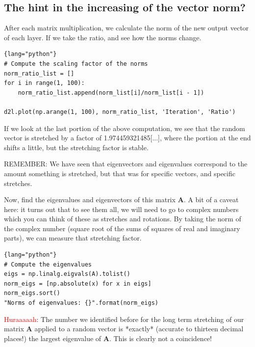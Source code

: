 \subsection{The hint in the increasing of the vector norm?}

After each matrix multiplication, we calculate the norm of the new output vector of each layer. If we take the ratio, 
and see how the norms change. 

\begin{mdframed}

\begin{lstlisting}{lang="python"}
# Compute the scaling factor of the norms
norm_ratio_list = []
for i in range(1, 100):
    norm_ratio_list.append(norm_list[i]/norm_list[i - 1])

d2l.plot(np.arange(1, 100), norm_ratio_list, 'Iteration', 'Ratio')
\end{lstlisting}

If we look at the last portion of the above computation, we see that the random
vector is stretched by a factor of 1.974459321485[...], where the portion at
the end shifts a little, but the stretching factor is stable.

\end{mdframed}


REMEMBER: We have seen that eigenvectors and eigenvalues correspond to the
amount something is stretched, but that was for specific vectors, and specific
stretches.

Now, find the eigenvalues and eigenvectors of this matrix $\mathbf{A}$.
A bit of a caveat here: it turns out that to see them all, we will need to go to
complex numbers which you can think of these as stretches and rotations.
By taking the norm of the complex number (square root of the sums of squares of
real and imaginary parts), we can measure that stretching factor.

\begin{lstlisting}{lang="python"}
# Compute the eigenvalues
eigs = np.linalg.eigvals(A).tolist()
norm_eigs = [np.absolute(x) for x in eigs]
norm_eigs.sort()
"Norms of eigenvalues: {}".format(norm_eigs)
\end{lstlisting}

\textcolor{red}{Huraaaaah}: The number we identified before for the long term
stretching of our matrix $\mathbf{A}$ applied to a random vector is *exactly*
(accurate to thirteen decimal places!) the largest eigenvalue of $\mathbf{A}$.
This is clearly not a coincidence!


